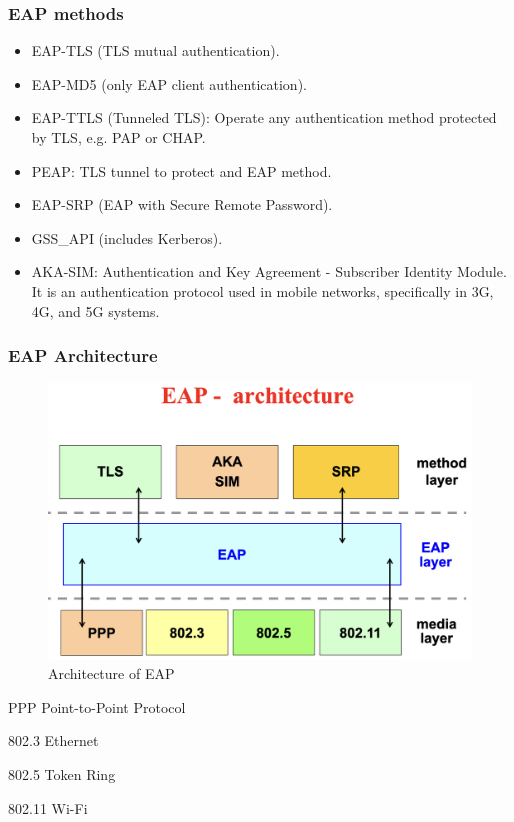 \subsubsection*{EAP methods}

\begin{itemize}
    \item EAP-TLS (TLS mutual authentication).
    \item EAP-MD5 (only EAP client authentication).
    \item EAP-TTLS (Tunneled TLS): Operate any authentication method protected by TLS, e.g. PAP or CHAP.
    \item PEAP: TLS tunnel to protect and EAP method.
    \item EAP-SRP (EAP with Secure Remote Password).
    \item GSS\_API (includes Kerberos).
    \item AKA-SIM: Authentication and Key Agreement - Subscriber Identity Module. It is an authentication protocol used in mobile networks, specifically in 3G, 4G, and 5G systems.
\end{itemize}

\subsubsection*{EAP Architecture}

\begin{figure}[H]
    \centering
    \includegraphics[width=0.5\linewidth]{Images/NetSec/eapArchitecture.png}
    \caption{Architecture of EAP}
\end{figure}

\begin{tcolorbox}[colback=blue!10!white, colframe=blue!50!white, title=Essentials of link-layer protocols] 
PPP \textrightarrow Point-to-Point Protocol

802.3 \textrightarrow Ethernet

802.5 \textrightarrow Token Ring

802.11 \textrightarrow Wi-Fi
\end{tcolorbox}

